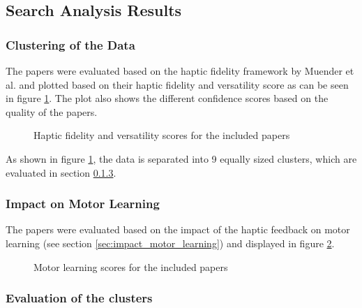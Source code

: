 \subsection{Search Analysis Results}

\subsubsection{Clustering of the Data}
The papers were evaluated based on the haptic fidelity framework by Muender et al. \cite{Muender2022HapticReality} and plotted based on their haptic fidelity and versatility score as can be seen in figure \ref{fig:fidelity_plot}. The plot also shows the different confidence scores based on the quality of the papers. 

\begin{figure}[htbp]

\caption{Haptic fidelity and versatility scores for the included papers}
\label{fig:fidelity_plot}
\end{figure}

As shown in figure \ref{fig:fidelity_plot}, the data is separated into 9 equally sized clusters, which are evaluated in section \ref{sec:evaluation_clusters}.


\subsubsection{Impact on Motor Learning}
The papers were evaluated based on the impact of the haptic feedback on motor learning (see section \ref{sec:impact_motor_learning}) and displayed in figure \ref{fig:motorlearning_plot}.

\begin{figure}[htbp]

\caption{Motor learning scores for the included papers}
\label{fig:motorlearning_plot}
\end{figure}



\subsubsection{Evaluation of the clusters}
\label{sec:evaluation_clusters}

